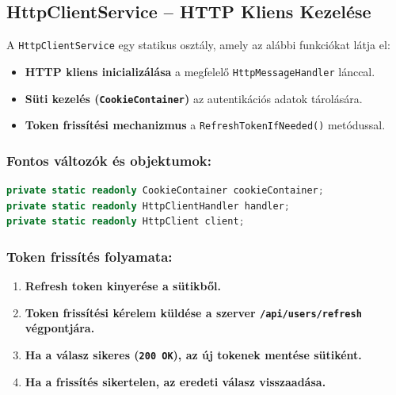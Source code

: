 \documentclass{report}[11pt]
\begin{document}
\subsection{HttpClientService – HTTP Kliens Kezelése}
A \texttt{HttpClientService} egy statikus osztály, amely az alábbi funkciókat látja el:
\begin{itemize}
    \item \textbf{HTTP kliens inicializálása} a megfelelő \texttt{HttpMessageHandler} lánccal.
    \item \textbf{Süti kezelés (\texttt{CookieContainer})} az autentikációs adatok tárolására.
    \item \textbf{Token frissítési mechanizmus} a \texttt{RefreshTokenIfNeeded()} metódussal.
\end{itemize}

\subsubsection{Fontos változók és objektumok:}
\begin{lstlisting}[language=csharp]
private static readonly CookieContainer cookieContainer;
private static readonly HttpClientHandler handler;
private static readonly HttpClient client;
\end{lstlisting}

\subsubsection{Token frissítés folyamata:}
\begin{enumerate}
    \item \textbf{Refresh token kinyerése a sütikből.}
    \item \textbf{Token frissítési kérelem küldése a szerver \texttt{/api/users/refresh} végpontjára.}
    \item \textbf{Ha a válasz sikeres (\texttt{200 OK}), az új tokenek mentése sütiként.}
    \item \textbf{Ha a frissítés sikertelen, az eredeti válasz visszaadása.}
\end{enumerate}
\end{document}
